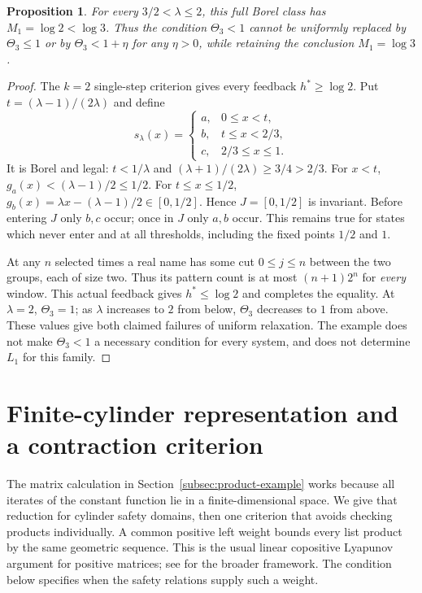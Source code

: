 \documentclass[11pt,reqno]{amsart}
\numberwithin{equation}{section}
\newtheorem{proposition}[theorem]{Proposition}
\theoremstyle{definition}
\theoremstyle{definition}
\begin{document}
\begin{proposition}\label{prop:critical}
For every $3/2<\lambda\le2$, this full Borel class has
$M_1=\log2<\log3$. Thus the condition $\Theta_3<1$ cannot be
uniformly replaced by $\Theta_3\le1$ or by
$\Theta_3<1+\eta$ for any $\eta>0$, while retaining the
conclusion $M_1=\log3$.
\end{proposition}
\begin{proof}
The $k=2$ single-step criterion gives every feedback
$h^*\ge\log2$. Put $t=(\lambda-1)/(2\lambda)$ and define
\[
 s_\lambda(x)=\begin{cases}
 a,&0\le x<t,\\ b,&t\le x<2/3,\\ c,&2/3\le x\le1.
 \end{cases}
\]
It is Borel and legal: $t<1/\lambda$ and
$(\lambda+1)/(2\lambda)\ge3/4>2/3$.
For $x<t$, $g_a(x)<(\lambda-1)/2\le1/2$.
For $t\le x\le1/2$,
$g_b(x)=\lambda x-(\lambda-1)/2\in[0,1/2]$.
Hence $J=[0,1/2]$ is invariant. Before entering $J$ only
$b,c$ occur; once in $J$ only $a,b$ occur. This remains true
for states which never enter and at all thresholds, including the
fixed points $1/2$ and $1$.

At any $n$ selected times a real name has some cut $0\le j\le n$
between the two groups, each of size two. Thus its pattern count
is at most $(n+1)2^n$ for \emph{every} window. This actual
feedback gives $h^*\le\log2$ and completes the equality.
At $\lambda=2$, $\Theta_3=1$; as $\lambda$ increases to $2$
from below, $\Theta_3$ decreases to $1$ from above. These values
give both claimed failures of uniform relaxation. The example
does not make $\Theta_3<1$ a necessary condition for every
system, and does not determine $L_1$ for this family.
\end{proof}

\section{Finite-cylinder representation and a contraction criterion}\label{sec:cylinder}

The matrix calculation in Section~\ref{subsec:product-example} works
because all iterates of the constant function lie in a finite-dimensional
space. We give that reduction for cylinder safety domains, then one
criterion that avoids checking products individually. A common positive
left weight bounds every list product by the same geometric sequence.
This is the usual linear copositive Lyapunov argument for positive
matrices; see \cite{Debauche2022} for the broader framework. The
condition below specifies when the safety relations supply such a weight.
\end{document}
